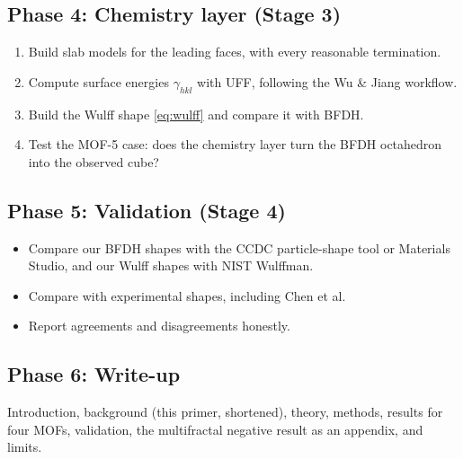 \documentclass[11pt,a4paper]{article}
\theoremstyle{remark}\newtheorem*{example}{Worked example}
\begin{document}
\subsection*{Phase 4: Chemistry layer (Stage 3)}
\begin{enumerate}
\item Build slab models for the leading faces, with every reasonable termination.
\item Compute surface energies $\gamma_{hkl}$ with UFF, following the Wu \& Jiang workflow.
\item Build the Wulff shape \eqref{eq:wulff} and compare it with BFDH.
\item Test the MOF-5 case: does the chemistry layer turn the BFDH octahedron into the observed cube?
\end{enumerate}

\subsection*{Phase 5: Validation (Stage 4)}
\begin{itemize}
\item Compare our BFDH shapes with the CCDC particle-shape tool or Materials Studio, and our Wulff shapes with NIST Wulffman.
\item Compare with experimental shapes, including Chen et al.
\item Report agreements and disagreements honestly.
\end{itemize}

\subsection*{Phase 6: Write-up}
Introduction, background (this primer, shortened), theory, methods, results for four MOFs, validation, the multifractal negative result as an appendix, and limits.
\end{document}
